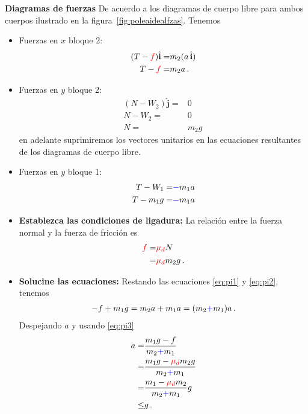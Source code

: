 \begin{enumerate}
\textbf{Diagramas de fuerzas} De acuerdo a los diagramas de cuerpo libre para ambos cuerpos ilustrado en la figura~\ref{fig:poleaidealfzas}. Tenemos
\begin{itemize}
\item Fuerzas en $x$ bloque 2:
  \begin{align}
    \label{eq:pi1}
    (T-{\color{red}f})\hat{\mathbf{i}}=&m_2 (a\,\hat{\mathbf{i}})\nonumber\\
    T-{\color{red}f}=&m_2 a\,.
  \end{align}
\item Fuerzas en $y$ bloque 2:
  \begin{align}
    (N-W_2)\hat{\mathbf{j}}=&0\nonumber\\
    N-W_2=&0\nonumber\\
    N=&m_2 g\,
  \end{align}
en adelante suprimiremos los vectores unitarios en las ecuaciones resultantes de los diagramas de cuerpo libre.
\item Fuerzas en $y$ bloque 1:
  \begin{align}
    \label{eq:pi2}
    T-W_1=&{\color{blue}-}m_1 a\nonumber\\
    T-m_1 g=&{\color{blue}-}m_1 a
  \end{align}
\item \textbf{Establezca las condiciones de ligadura:} La relación entre la fuerza normal y la fuerza de fricción es
  \begin{align}
    \label{eq:pi3}
    {\color{red}f}=&{\color{red}\mu_d} N\nonumber\\
    =&{\color{red}\mu_d} m_2 g\,.
  \end{align}
\item \textbf{Solucine las ecuaciones:} Restando las ecuaciones \eqref{eq:pi1} y \eqref{eq:pi2}, tenemos
  \begin{align*}
    -f+m_1 g=m_2 a+m_1 a=(m_2{\color{blue}+}m_1)a\,.
  \end{align*}
Despejando $a$ y usando \eqref{eq:pi3}
\begin{align}
  \label{eq:polea}
  a=&\frac{m_1g-f}{m_2{\color{blue}+}m_1}\nonumber\\
  =&\frac{m_1g-{\color{red}\mu_d} m_2 g}{m_2{\color{blue}+}m_1}\nonumber\\
  =&\frac{m_1-{\color{red}\mu_d} m_2 }{m_2{\color{blue}+}m_1}g\\
  \le&g\nonumber\,.
\end{align}

\end{itemize}




\end{enumerate}
